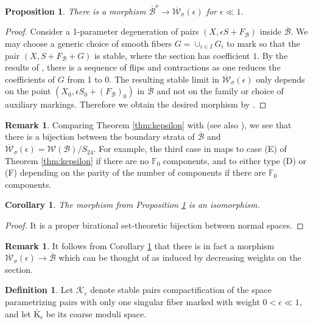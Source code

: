 \documentclass[11pt]{amsart}
\newtheorem{prop}[theorem]{Proposition}
\newtheorem{cor}[theorem]{Corollary}
\theoremstyle{definition}
\newtheorem{definition}[theorem]{Definition}
\newtheorem{remark}[theorem]{Remark}
\theoremstyle{remark}
\newcommand{\calB}{\mathcal B}
\newcommand{\ke}{\overline{\mathcal{K}}_{\epsilon}}
\newcommand{\me}{\overline{\mathrm{K}}_\epsilon}
\newcommand{\kepsilon}{\overline{\mathcal{W}}_\sigma(\epsilon)}
\newcommand{\bru}{\overline{\mathscr{B}}}
\begin{document}
	\begin{prop}\label{prop:brunyate}There is a morphism $\bru^\nu \to \overline{\mathcal{W}}_\sigma(\epsilon)$ for $\epsilon \ll 1$. \end{prop}
	\begin{proof} Consider a 1-parameter degeneration of pairs $(X, \epsilon S + F_\calB)$ inside $\bru$. We may choose a generic choice of smooth fibers $G = \cup_{i \in I} G_i$ to mark so that the pair $(X, S + F_\calB + G)$ is stable, where the section has coefficient $1$. By the results of \cite{master}, there is a sequence of flips and contractions as one reduces the coefficients of $G$ from 1 to 0. The resulting stable limit in $\overline{\mathcal{W}}_\sigma(\epsilon)$ only depends on the point $(X_0, \epsilon S_0 + (F_\calB)_0)$ in $\bru$ and not on the family or choice of auxiliary markings. Therefore we obtain the desired morphism by \cite[Theorem 7.3]{gg}. \end{proof}
	
	
	\begin{remark}\label{rmk:brunyate} Comparing Theorem \ref{thm:kepsilon} with \cite[Theorem 9.1.4]{brunyate} (see also \cite[Section 7]{abe}), we see that there is a bijection between the boundary strata of $\bru$ and $\kepsilon = \mathcal{W}(\calB)/S_{24}$. For example, the third case in \cite[Theorem 9.1.4]{brunyate} maps to case (E) of Theorem \ref{thm:kepsilon} if there are no $\mathbb{F}_0$ components, and to either type (D) or (F) depending on the parity of the number of components if there are $\mathbb{F}_0$ components. 
	\end{remark} 
	
	\begin{cor}\label{cor:brunyate} The morphism from Proposition \ref{prop:brunyate} is an isomorphism. \end{cor} 
	
	\begin{proof} It is a proper birational set-theoretic bijection between normal spaces. \end{proof} 
	
	\begin{remark}\label{rem:brunyate2} It follows from Corollary \ref{cor:brunyate} that there is in fact a morphism $\kepsilon \to \bru$ which can be thought of as induced by decreasing weights on the section. \end{remark} 
	
	
	\begin{definition} Let $\ke$ denote stable pairs compactification of the space parametrizing pairs with only one singular fiber marked with weight $0 < \epsilon \ll 1$, and let $\me$ be its coarse moduli space. 
	\end{definition} 
	
\end{document}
